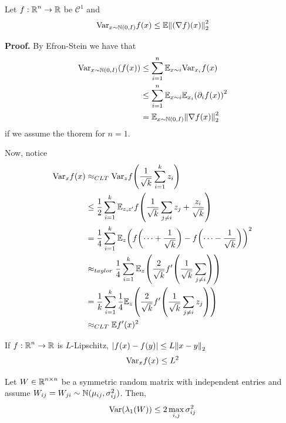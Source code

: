 \begin{theorem}
    Let $f: \operatorname{\mathbb{R}}^n \to \operatorname{\mathbb{R}}$ be $\mathcal{C}^1$ and
    \[ \text{Var}_{x \sim \operatorname{\mathbb{N}}(0, I)} f(x) \le \mathbb{E} \norm{(\nabla f)(x)}_2^2 \]
    
    \textbf{Proof.}
        By Efron-Stein we have that
        \begin{align*}
            \text{Var}_{x \sim \operatorname{\mathbb{N}}(0, I)} (f(x)) &\le \sum_{i = 1}^n \mathbb{E}_{x \sim i} \text{Var}_{x_i} f(x) \\
            &\le \sum_{i = 1}^{n} \mathbb{E}_{x \sim i} \mathbb{E}_{x_i} \qty(\partial_i f(x))^2 \\
            &= \mathbb{E}_{ x \sim \operatorname{\mathbb{N}}(0, I)} \norm{\nabla f(x)}_2^2
        \end{align*}
        if we assume the thorem for $n = 1$.

        Now, notice 
        \begin{align*}
            \text{Var}_x f(x) &\approx_{CLT} \text{Var}_{z} f\qty( \frac{1}{\sqrt{k}} \sum_{i = 1}^k z_i) \\
            &\le \frac{1}{2} \sum_{i = 1}^{k} \mathbb{E}_{z, z'} f\qty(\frac{1}{\sqrt{k}} \sum_{j \neq i} z_j + \frac{z_i}{\sqrt{k} }) \\
            &= \frac{1}{4} \sum_{i = 1}^{k} \mathbb{E}_{z} \qty(f\qty(\dots + \frac{1}{\sqrt{k}}) - f\qty(\dots - \frac{1}{\sqrt{k}}))^2 \\
            &\approx_{taylor} \frac{1}{4} \sum_{i = 1}^k \mathbb{E}_z \qty(\frac{2}{\sqrt{k}} f'\qty(\frac{1}{\sqrt{k}} \sum_{j \neq i})) \\
            &= \frac{1}{k} \sum_{i = 1}^{k} \frac{1}{4} \mathbb{E}_z \qty(\frac{2}{\sqrt{k}} f'\qty(\frac{1}{\sqrt{k}} \sum_{j \neq i} z_j)) \\
            &\approx_{CLT} \mathbb{E} f'(x)^2
        \end{align*}
\end{theorem}

\begin{corollary}
    If $f: \operatorname{\mathbb{R}}^n \to \operatorname{\mathbb{R}}$ is $L$-Lipschitz,
    $|f(x) -f(y)| \le L \norm{x - y}_2$
    \[ \text{Var}_x f(x) \le L^2 \]
\end{corollary}

\begin{theorem}
    Let $W \in \operatorname{\mathbb{R}}^{n \times n}$ be a symmetric random matrix with independent entries and assume $W_{ij} = W_{ji} \sim \operatorname{\mathbb{N}}(\mu_{ij} ,\sigma_{ij}^2)$.
    Then,
    \[ \text{Var}(\lambda_1(W)) \le 2 \max_{i,j} \sigma_{ij}^2 \]
\end{theorem}

